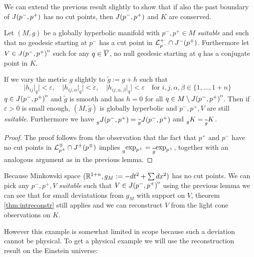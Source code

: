 We can extend the previous result slightly to show that if also the past boundary of $J(p^-,p^+)$ has no cut points, then $J(p^-,p^+)$ and $K$ are conserved.
\begin{corollary}\label{cor:suitablestable}
    Let $(M,g)$ be a globally hyperbolic manifold with $p^-,p^+\in M$ \emph{suitable} and such that no geodesic starting at $p^-$ has a cut point in ${\mathcal{L}}^+_{p^-}\cap J^-(p^+)$. Furthermore let $V\in {\kern0ptJ(p^-,p^+)}^{\mathrm{o}}$ such for any $q\in {\overline{V}}$, no null geodesic starting at $q$ has a conjugate point in $K$.
    
    If we vary the metric $g$ slightly to $\widetilde{g}:=g+h$ such that 
    \[
        \lvert h_{ij}\rvert_q \rvert <\varepsilon, \quad \lvert h_{ij,\alpha}\rvert_q \rvert <\varepsilon, \quad \lvert h_{ij,\alpha,\beta}\rvert_q \rvert <\varepsilon \quad \text{for } i,j,\alpha,\beta\in \{1,\dots, 1+n\}
    \] $q\in {\kern0ptJ(p^-,p^+)}^{\mathrm{o}}$
    and $\widetilde{g}$ is smooth and has $h=0$ for all $q\in M\setminus {\kern0ptJ(p^-,p^+)}^{\mathrm{o}}$. Then if $\varepsilon>0$ is small enough, $(M,\widetilde{g})$ is globally hyperbolic and $p^-,p^+,V$ are still \emph{suitable}. Furthermore we have $\prescript{}{g}{J(p^-,p^+)}=\prescript{}{\widetilde{g}}{J(p^-,p^+)}$ and $\prescript{}{g}{K}=\prescript{}{\widetilde{g}}{K}$.
\end{corollary}
\begin{proof}
    The proof follows from the observation that the fact that $p^+$ and $p^-$ have no cut points in ${\mathcal{L}}^\mp_{p^\pm} \cap J^\pm(p^\mp)$ implies $\prescript{}{g}{\exp_{p^\pm}}= \prescript{}{\widetilde{g}}{\exp_{p^\pm}}$, together with an analogous argument as in the previous lemma.
\end{proof}

\begin{example}
    Because Minkowski space $(\mathbb{R}^{1+n}, g_M:=-dt^2 + \sum dx^2)$ has no cut points. We can pick any $p^-,p^+,V$ \emph{suitable} such that $V\in {\kern0ptJ(p^-,p^+)}^{\mathrm{o}}$ using the previous lemma we can see that for small deviatations from $g_M$ with support on $V$, theorem \ref{thm:intreconstr} still applies and we can reconstruct $V$ from the light cone observations on $K$.
\end{example}



However this example is somewhat limited in scope because such a deviation cannot be physical. To get a physical example we will use the reconstruction result on the Einstein universe:

